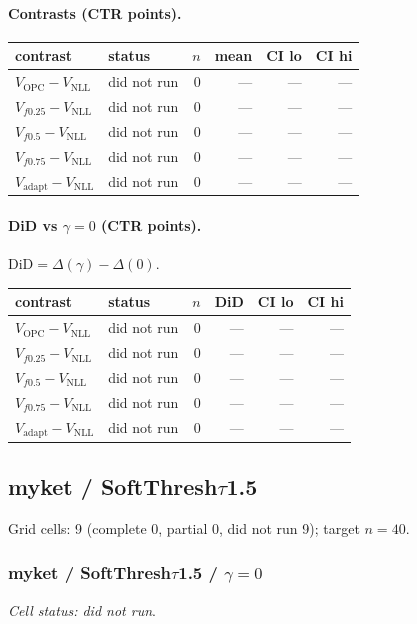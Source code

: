 \documentclass[10pt,a4paper]{article}
\begin{document}
\paragraph{Contrasts (CTR points).}
{\centering\small\begin{tabular}{llrrrr}
\toprule contrast & status & $n$ & mean & CI lo & CI hi \\
\midrule
$V_{\mathrm{OPC}}-V_{\mathrm{NLL}}$ & did not run & 0 & --- & --- & --- \\
$V_{f0.25}-V_{\mathrm{NLL}}$ & did not run & 0 & --- & --- & --- \\
$V_{f0.5}-V_{\mathrm{NLL}}$ & did not run & 0 & --- & --- & --- \\
$V_{f0.75}-V_{\mathrm{NLL}}$ & did not run & 0 & --- & --- & --- \\
$V_{\mathrm{adapt}}-V_{\mathrm{NLL}}$ & did not run & 0 & --- & --- & --- \\
\bottomrule\end{tabular}\par}
\paragraph{DiD vs $\gamma=0$ (CTR points).} $\mathrm{DiD}=\Delta(\gamma)-\Delta(0)$.
{\centering\small\begin{tabular}{llrrrr}
\toprule contrast & status & $n$ & DiD & CI lo & CI hi \\
\midrule
$V_{\mathrm{OPC}}-V_{\mathrm{NLL}}$ & did not run & 0 & --- & --- & --- \\
$V_{f0.25}-V_{\mathrm{NLL}}$ & did not run & 0 & --- & --- & --- \\
$V_{f0.5}-V_{\mathrm{NLL}}$ & did not run & 0 & --- & --- & --- \\
$V_{f0.75}-V_{\mathrm{NLL}}$ & did not run & 0 & --- & --- & --- \\
$V_{\mathrm{adapt}}-V_{\mathrm{NLL}}$ & did not run & 0 & --- & --- & --- \\
\bottomrule\end{tabular}\par}
\bigskip
\newpage
\subsection{myket / SoftThresh$\tau$1.5}
Grid cells: 9 (complete 0, partial 0, did not run 9); target $n=40$.
\subsubsection{myket / SoftThresh$\tau$1.5 / $\gamma=0$}
\emph{Cell status: did not run}.
\end{document}
